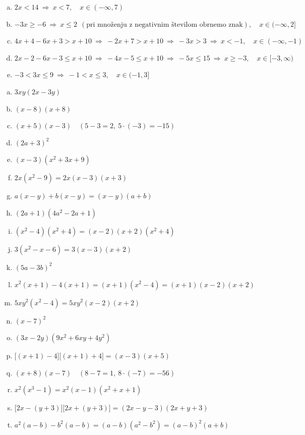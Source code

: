 \documentclass[a4paper,12pt]{letter}
\begin{document}
\begin{resitev}
\begin{enumerate}[a)]
\item $\displaystyle 2x<14\ \Rightarrow\ x<7,\quad x\in(-\infty,7)$
\item $\displaystyle -3x\ge-6\ \Rightarrow\ x\le2\ \ (\text{pri mno\v{z}enju z negativnim \v{s}tevilom obrnemo znak}),\quad x\in(-\infty,2]$
\item $\displaystyle 4x+4-6x+3>x+10\ \Rightarrow\ -2x+7>x+10\ \Rightarrow\ -3x>3\ \Rightarrow\ x<-1,\quad x\in(-\infty,-1)$
\item $\displaystyle 2x-2-6x-3\le x+10\ \Rightarrow\ -4x-5\le x+10\ \Rightarrow\ -5x\le15\ \Rightarrow\ x\ge-3,\quad x\in[-3,\infty)$
\item $\displaystyle -3<3x\le9\ \Rightarrow\ -1<x\le3,\quad x\in(-1,3]$
\end{enumerate}
\end{resitev}

\begin{resitev}
\begin{enumerate}[a)]
\item $\displaystyle 3xy(2x-3y)$
\item $\displaystyle (x-8)(x+8)$
\item $\displaystyle (x+5)(x-3)\quad(5-3=2,\ 5\cdot(-3)=-15)$
\item $\displaystyle (2a+3)^2$
\item $\displaystyle (x-3)(x^2+3x+9)$
\item $\displaystyle 2x(x^2-9)=2x(x-3)(x+3)$
\item $\displaystyle a(x-y)+b(x-y)=(x-y)(a+b)$
\item $\displaystyle (2a+1)(4a^2-2a+1)$
\item $\displaystyle (x^2-4)(x^2+4)=(x-2)(x+2)(x^2+4)$
\item $\displaystyle 3(x^2-x-6)=3(x-3)(x+2)$
\item $\displaystyle (5a-3b)^2$
\item $\displaystyle x^2(x+1)-4(x+1)=(x+1)(x^2-4)=(x+1)(x-2)(x+2)$
\item $\displaystyle 5xy^2(x^2-4)=5xy^2(x-2)(x+2)$
\item $\displaystyle (x-7)^2$
\item $\displaystyle (3x-2y)(9x^2+6xy+4y^2)$
\item $\displaystyle \big[(x+1)-4\big]\big[(x+1)+4\big]=(x-3)(x+5)$
\item $\displaystyle (x+8)(x-7)\quad(8-7=1,\ 8\cdot(-7)=-56)$
\item $\displaystyle x^2(x^3-1)=x^2(x-1)(x^2+x+1)$
\item $\displaystyle \big[2x-(y+3)\big]\big[2x+(y+3)\big]=(2x-y-3)(2x+y+3)$
\item $\displaystyle a^2(a-b)-b^2(a-b)=(a-b)(a^2-b^2)=(a-b)^2(a+b)$
\end{enumerate}
\end{resitev}
\end{document}
